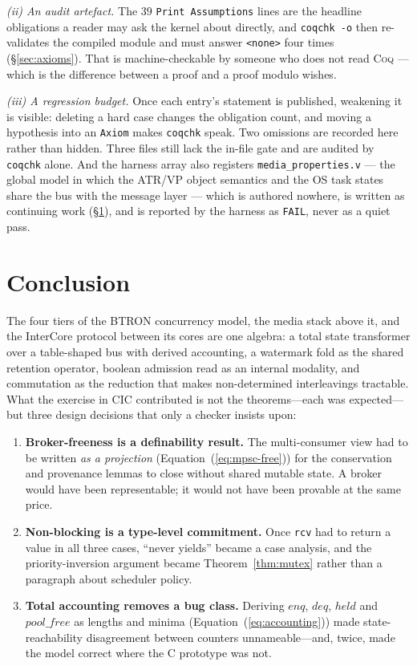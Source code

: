 \documentclass[10pt,journal,compsoc,twocolumn]{article}
\theoremstyle{definition}
\theoremstyle{remark}
\theoremstyle{plain}
\newcommand{\Coq}{\textsc{Coq}}
\newcommand{\CIC}{\textsc{CIC}}
\newcommand{\ctr}[1]{\texttt{#1}}
\begin{document}
\emph{(ii) An audit artefact.} The \(39\) \ctr{Print Assumptions} lines are the
headline obligations a reader may ask the kernel about directly, and
\ctr{coqchk -o} then re-validates the compiled module and must answer
\ctr{<none>} four times (\S\ref{sec:axioms}). That is machine-checkable by someone
who does not read \Coq{} --- which is the difference between a proof and a proof
modulo wishes.

\emph{(iii) A regression budget.} Once each entry's statement is published,
weakening it is visible: deleting a hard case changes the obligation count, and
moving a hypothesis into an \ctr{Axiom} makes \ctr{coqchk} speak. Two omissions
are recorded here rather than hidden. Three files still lack the in-file gate and
are audited by \ctr{coqchk} alone. And the harness array also registers
\ctr{media\_properties.v} --- the global model in which the ATR/VP object
semantics and the OS task states share the bus with the message layer --- which is
authored nowhere, is written as continuing work (\S\ref{sec:conclusion}), and is
reported by the harness as \ctr{FAIL}, never as a quiet pass.

\section{Conclusion}
\label{sec:conclusion}

The four tiers of the BTRON concurrency model, the media stack above it, and the InterCore protocol between its cores are one algebra: a total state transformer over a table-shaped bus with derived accounting, a watermark fold as the shared retention operator, boolean admission read as an internal modality, and commutation as the reduction that makes non-determined interleavings tractable. What the exercise in \CIC{} contributed is not the theorems---each was expected---but three design decisions that only a checker insists upon:

\begin{enumerate}[leftmargin=*]
    \item \textbf{Broker-freeness is a definability result.} The multi-consumer view had to be written \emph{as a projection} (Equation~(\ref{eq:mpsc-free})) for the conservation and provenance lemmas to close without shared mutable state. A broker would have been representable; it would not have been provable at the same price.
    \item \textbf{Non-blocking is a type-level commitment.} Once \ctr{rcv} had to return a value in all three cases, ``never yields'' became a case analysis, and the priority-inversion argument became Theorem~\ref{thm:mutex} rather than a paragraph about scheduler policy.
    \item \textbf{Total accounting removes a bug class.} Deriving \(\mathit{enq}\), \(\mathit{deq}\), \(\mathit{held}\) and \(\mathit{pool\_free}\) as lengths and minima (Equation~(\ref{eq:accounting})) made state-reachability disagreement between counters unnameable---and, twice, made the model correct where the C prototype was not.
\end{enumerate}
\end{document}
